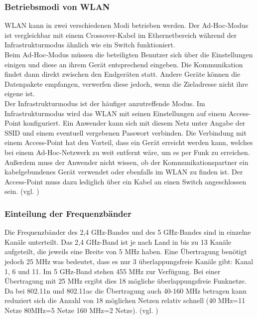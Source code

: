 \subsubsection{Betriebsmodi von WLAN}
WLAN kann in zwei verschiedenen Modi betrieben werden. Der Ad-Hoc-Modus ist vergleichbar mit einem Crossover-Kabel im Ethernetbereich während der Infrastrukturmodus ähnlich wie ein Switch funktioniert.\\
Beim Ad-Hoc-Modus müssen die beteiligten Benutzer sich über die Einstellungen einigen und diese an ihrem Gerät entsprechend eingeben. Die Kommunikation findet dann direkt zwischen den Endgeräten statt. Andere Geräte können die Datenpakete empfangen, verwerfen diese jedoch, wenn die Zieladresse nicht ihre eigene ist.\\
Der Infrastrukturmodus ist der häufiger anzutreffende Modus. Im Infrastrukturmodus wird das WLAN mit seinen Einstellungen auf einem Access-Point konfiguriert. Ein Anwender kann sich mit diesem Netz unter Angabe der \ac{SSID} und einem eventuell vergebenen Passwort verbinden. Die Verbindung mit einem Access-Point hat den Vorteil, dass ein Gerät erreicht werden kann, welches bei einem Ad-Hoc-Netzwerk zu weit entfernt wäre, um es per Funk zu erreichen. Außerdem muss der Anwender nicht wissen, ob der Kommunikationspartner ein kabelgebundenes Gerät verwendet oder ebenfalls im WLAN zu finden ist. Der Access-Point muss dazu lediglich über ein Kabel an einen Switch angeschlossen sein. (vgl. \cite{SWB-430171331})

\subsubsection{Einteilung der Frequenzbänder}
Die Frequenzbänder des 2,4 GHz-Bandes und des 5 GHz-Bandes sind in einzelne Kanäle unterteilt. Das 2,4 GHz-Band ist je nach Land in bis zu 13 Kanäle aufgeteilt, die jeweils eine Breite von 5 MHz haben. Eine Übertragung benötigt jedoch 25 MHz was bedeutet, dass es nur 3 überlappungsfreie Kanäle gibt: Kanal 1, 6 und 11. Im 5 GHz-Band stehen 455 MHz zur Verfügung. Bei einer Übertragung mit 25 MHz ergibt dies 18 mögliche überlappungsfreie Funknetze. Da bei 802.11n und 802.11ac die Übertragung auch 40-160 MHz betragen kann reduziert sich die Anzahl von 18 möglichen Netzen relativ schnell (40 MHz=11 Netze 80MHz=5 Netze 160 MHz=2 Netze). (vgl. \cite{SWB-430171331})

